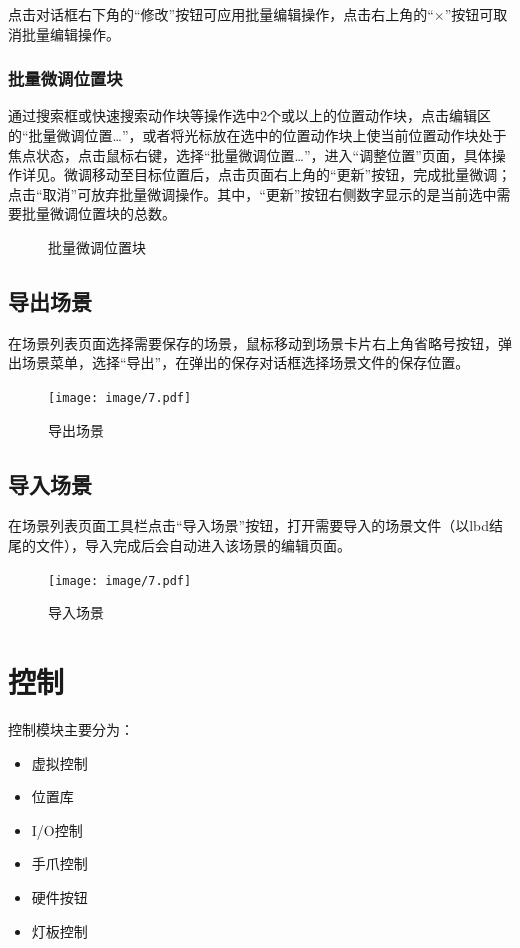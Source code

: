 点击对话框右下角的“修改”按钮可应用批量编辑操作，点击右上角的“$\times$”按钮可取消批量编辑操作。


\subsubsection{批量微调位置块}
通过搜索框或快速搜索动作块等操作选中2个或以上的位置动作块，点击编辑区的“批量微调位置…”，或者将光标放在选中的位置动作块上使当前位置动作块处于焦点状态，点击鼠标右键，选择“批量微调位置…”，进入“调整位置”页面，具体操作详见。微调移动至目标位置后，点击页面右上角的“更新”按钮，完成批量微调；点击“取消”可放弃批量微调操作。其中，“更新”按钮右侧数字显示的是当前选中需要批量微调位置块的总数。

\begin{figure}[ht]
	\centering
	\color{red}{缺图}
	\caption{批量微调位置块}
	\label{fig:批量微调位置块}
\end{figure}

\subsection{导出场景}
在场景列表页面选择需要保存的场景，鼠标移动到场景卡片右上角省略号按钮，弹出场景菜单，选择“导出”，在弹出的保存对话框选择场景文件的保存位置。

\begin{figure}[ht]
	\centering
	\texttt{[image: image/7.pdf]}
	\caption{导出场景}
	\label{fig:导出场景}
\end{figure}

\subsection{导入场景}
在场景列表页面工具栏点击“导入场景”按钮，打开需要导入的场景文件（以lbd结尾的文件），导入完成后会自动进入该场景的编辑页面。

\begin{figure}[ht]
	\centering
	\texttt{[image: image/7.pdf]}
	\caption{导入场景}
	\label{fig:导入场景}
\end{figure}

\section{控制}
控制模块主要分为：
\begin{itemize}
\item 虚拟控制
\item 位置库
\item I/O控制
\item 手爪控制
\item 硬件按钮
\item 灯板控制
\end{itemize}

